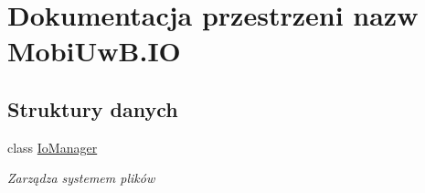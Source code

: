 \hypertarget{a00270}{}\section{Dokumentacja przestrzeni nazw Mobi\+Uw\+B.\+I\+O}
\label{a00270}
\subsection*{Struktury danych}
\begin{DoxyCompactItemize}
\item 
class \hyperlink{a00027}{Io\+Manager}
\begin{DoxyCompactList}\small\item\em Zarządza systemem plików \end{DoxyCompactList}\end{DoxyCompactItemize}
